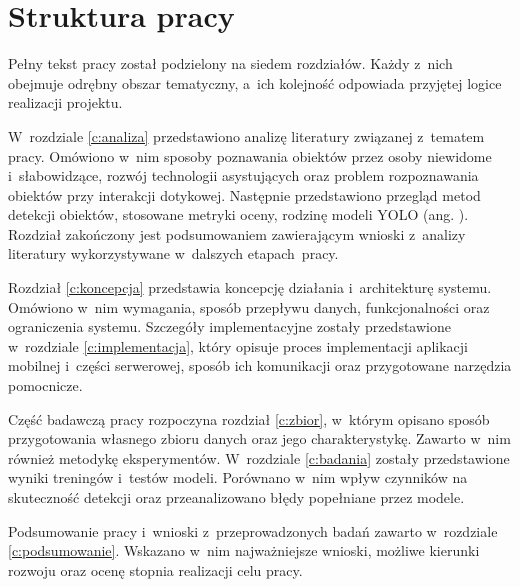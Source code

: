 \section{Struktura pracy}

Pełny tekst pracy został podzielony na siedem rozdziałów. Każdy z~nich obejmuje odrębny obszar tematyczny, a~ich kolejność odpowiada przyjętej logice realizacji projektu.

W~rozdziale \ref{c:analiza} przedstawiono analizę literatury związanej z~tematem pracy. Omówiono w~nim sposoby poznawania obiektów przez osoby niewidome i~słabowidzące, rozwój technologii asystujących oraz problem rozpoznawania obiektów przy interakcji dotykowej. Następnie przedstawiono przegląd metod detekcji obiektów, stosowane metryki oceny, rodzinę modeli YOLO (ang. ). Rozdział zakończony jest podsumowaniem zawierającym wnioski z~analizy literatury wykorzystywane w~dalszych etapach~pracy.

Rozdział \ref{c:koncepcja} przedstawia koncepcję działania i~architekturę systemu. Omówiono w~nim wymagania, sposób przepływu danych, funkcjonalności oraz ograniczenia systemu. Szczegóły implementacyjne zostały przedstawione w~rozdziale \ref{c:implementacja}, który opisuje proces implementacji aplikacji mobilnej i~części serwerowej, sposób ich komunikacji oraz przygotowane narzędzia pomocnicze.

Część badawczą pracy rozpoczyna rozdział \ref{c:zbior}, w~którym opisano sposób przygotowania własnego zbioru danych oraz jego charakterystykę. Zawarto w~nim również metodykę eksperymentów. W~rozdziale \ref{c:badania} zostały przedstawione wyniki treningów i~testów modeli. Porównano w~nim wpływ czynników na skuteczność detekcji oraz przeanalizowano błędy popełniane przez modele.

Podsumowanie pracy i~wnioski z~przeprowadzonych badań zawarto w~rozdziale \ref{c:podsumowanie}. Wskazano w~nim najważniejsze wnioski, możliwe kierunki rozwoju oraz ocenę stopnia realizacji celu pracy.
